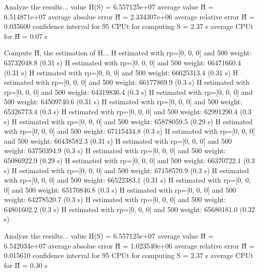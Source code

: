Analyze the results...
  value H(S)                  = 6.557125e+07 
  average value H̃             = 6.514871e+07 
  average absolue error H̃     = 2.334307e+06 
  average relative error H̃    = 0.035600 
  confidence interval for 95%
  CPUt for computing S         = 2.37 s
  average CPUt for H̃           = 0.07 s

Compute H̃, the estimation of H...
  H estimated with rp=[0, 0, 0] and 500 weight:  63732048.8  (0.31 s)
  H estimated with rp=[0, 0, 0] and 500 weight:  66471660.4  (0.31 s)
  H estimated with rp=[0, 0, 0] and 500 weight:  66625313.4  (0.31 s)
  H estimated with rp=[0, 0, 0] and 500 weight:  66177869.9  (0.3 s)
  H estimated with rp=[0, 0, 0] and 500 weight:  64319836.4  (0.3 s)
  H estimated with rp=[0, 0, 0] and 500 weight:  64509740.6  (0.31 s)
  H estimated with rp=[0, 0, 0] and 500 weight:  65326773.4  (0.3 s)
  H estimated with rp=[0, 0, 0] and 500 weight:  62991290.4  (0.3 s)
  H estimated with rp=[0, 0, 0] and 500 weight:  65878059.5  (0.29 s)
  H estimated with rp=[0, 0, 0] and 500 weight:  67115434.8  (0.3 s)
  H estimated with rp=[0, 0, 0] and 500 weight:  66438582.3  (0.31 s)
  H estimated with rp=[0, 0, 0] and 500 weight:  63750394.9  (0.3 s)
  H estimated with rp=[0, 0, 0] and 500 weight:  65086922.9  (0.29 s)
  H estimated with rp=[0, 0, 0] and 500 weight:  66370722.1  (0.3 s)
  H estimated with rp=[0, 0, 0] and 500 weight:  67158570.9  (0.3 s)
  H estimated with rp=[0, 0, 0] and 500 weight:  66522383.1  (0.31 s)
  H estimated with rp=[0, 0, 0] and 500 weight:  65170846.8  (0.3 s)
  H estimated with rp=[0, 0, 0] and 500 weight:  64278520.7  (0.3 s)
  H estimated with rp=[0, 0, 0] and 500 weight:  64801602.2  (0.3 s)
  H estimated with rp=[0, 0, 0] and 500 weight:  65680181.0  (0.32 s)

Analyze the results...
  value H(S)                  = 6.557125e+07 
  average value H̃             = 6.542034e+07 
  average absolue error H̃     = 1.023540e+06 
  average relative error H̃    = 0.015610 
  confidence interval for 95%
  CPUt for computing S         = 2.37 s
  average CPUt for H̃           = 0.30 s

